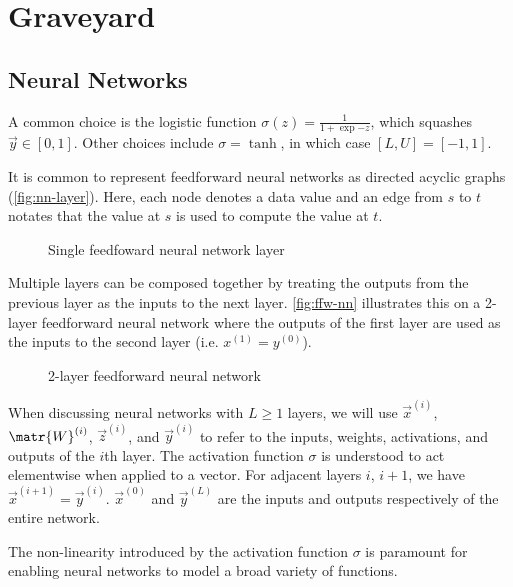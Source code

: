 \documentclass[dissertation.tex]{subfile}
\begin{document}
\chapter{Graveyard}

\section{Neural Networks}

A common choice is the logistic function $\sigma(z)
= \frac{1}{1+\exp{-z}}$, which squashes $\vec{y} \in [0, 1]$. Other choices
include $\sigma = \tanh$, in which case $[L, U] = [-1, 1]$.

It is common to represent feedforward neural networks as directed acyclic
graphs (\autoref{fig:nn-layer}). Here, each node denotes a data value and
an edge from $s$ to $t$ notates that the value at $s$ is used to compute the
value at $t$.

\begin{figure}[htpb]
    \centering
    
    \caption{Single feedfoward neural network layer}
    \label{fig:nn-layer}
\end{figure}

Multiple layers can be composed together by treating the outputs from the previous layer
as the inputs to the next layer. \autoref{fig:ffw-nn} illustrates this on a 2-layer
feedforward neural network where the outputs of the first layer are used as the
inputs to the second layer (i.e. $x^{(1)} = y^{(0)}$).


\begin{figure}[htbp]
    \centering
    
    \caption{2-layer feedforward neural network}
    \label{fig:ffw-nn}
\end{figure}

When discussing neural networks with $L \geq 1$ layers, we will use
$\vec{x}^{(i)}$, $\matr{W}^{(i)}$, $\vec{z}^{(i)}$, and $\vec{y}^{(i)}$ to
refer to the inputs, weights, activations, and outputs of the $i$th layer. The
activation function $\sigma$ is understood to act elementwise when applied to a
vector. For adjacent layers $i$, $i+1$, we have $\vec{x}^{(i+1)} =
\vec{y}^{(i)}$. $\vec{x}^{(0)}$ and $\vec{y}^{(L)}$ are the inputs and outputs
respectively of the entire network.

The non-linearity introduced by the activation function $\sigma$ is paramount
for enabling neural networks to model a broad variety of functions. 
\end{document}
